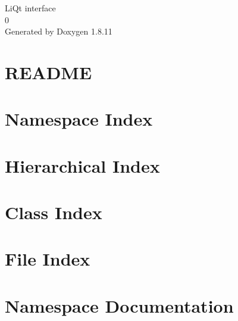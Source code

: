 \documentclass[twoside]{article}
\newcommand{\+}{\discretionary{\mbox{\scriptsize$\hookleftarrow$}}{}{}}
\begin{document}
\hypersetup{pageanchor=false,
             bookmarksnumbered=true,
             pdfencoding=unicode
            }
\begin{titlepage}
\vspace*{7cm}
\begin{center}%
{\Large Li\+Qt interface \\[1ex]\large 0 }\\
\vspace*{1cm}
{\large Generated by Doxygen 1.8.11}\\
\end{center}
\end{titlepage}
\tableofcontents
{}
\hypersetup{pageanchor=true}

\section{R\+E\+A\+D\+ME}
\label{md__home_mishko_Temp_test0_README}
\hypertarget{md__home_mishko_Temp_test0_README}{}

\section{Namespace Index}

\section{Hierarchical Index}

\section{Class Index}

\section{File Index}

\section{Namespace Documentation}

\end{document}
